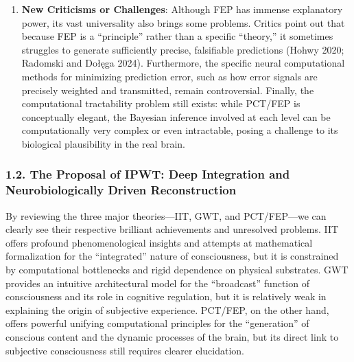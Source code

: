 \documentclass[
  a4paper]{article}
\begin{document}
\begin{enumerate}
{  Applications}: PCT/FEP's predictions have been validated in multiple
  experimental paradigms. For example, phenomena such as repetition
  suppression and mismatch negativity (MMN) in EEG signals have been
  successfully explained as manifestations of prediction error signals
  (Garrido et al. 2009). In the field of artificial intelligence, FEP
  and Active Inference ideas are widely applied to build more autonomous
  and adaptive reinforcement learning agents and world models for
  Artificial General Intelligence (AGI) (Maier 2025; PubMed 2024;
  Constant et al. 2022). Additionally, new software frameworks (e.g.,
  \texttt{RxInfer}) are being developed to facilitate researchers in
  building and testing FEP-based computational models.
\item
  \textbf{New Criticisms or Challenges}: Although FEP has immense
  explanatory power, its vast universality also brings some problems.
  Critics point out that because FEP is a ``principle'' rather than a
  specific ``theory,'' it sometimes struggles to generate sufficiently
  precise, falsifiable predictions (Hohwy 2020; Radomski and Dołęga
  2024). Furthermore, the specific neural computational methods for
  minimizing prediction error, such as how error signals are precisely
  weighted and transmitted, remain controversial. Finally, the
  computational tractability problem still exists: while PCT/FEP is
  conceptually elegant, the Bayesian inference involved at each level
  can be computationally very complex or even intractable, posing a
  challenge to its biological plausibility in the real brain.
\end{enumerate}

\subsubsection{1.2. The Proposal of IPWT: Deep Integration and
Neurobiologically Driven
Reconstruction}\label{the-proposal-of-ipwt-deep-integration-and-neurobiologically-driven-reconstruction}

By reviewing the three major theories---IIT, GWT, and PCT/FEP---we can
clearly see their respective brilliant achievements and unresolved
problems. IIT offers profound phenomenological insights and attempts at
mathematical formalization for the ``integrated'' nature of
consciousness, but it is constrained by computational bottlenecks and
rigid dependence on physical substrates. GWT provides an intuitive
architectural model for the ``broadcast'' function of consciousness and
its role in cognitive regulation, but it is relatively weak in
explaining the origin of subjective experience. PCT/FEP, on the other
hand, offers powerful unifying computational principles for the
``generation'' of conscious content and the dynamic processes of the
brain, but its direct link to subjective consciousness still requires
clearer elucidation.
\end{document}
